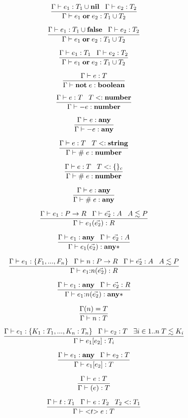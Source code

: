 \[
\dfrac{\Gamma \vdash e_{1}:T_{1} \cup \mathbf{nil} \;\;\;
       \Gamma \vdash e_{2}:T_{2}}
      {\Gamma \vdash e_{1} \; \mathbf{or} \; e_{2}:T_{1} \cup T_{2}}
\]

\[
\dfrac{\Gamma \vdash e_{1}:T_{1} \cup \mathbf{false} \;\;\;
       \Gamma \vdash e_{2}:T_{2}}
      {\Gamma \vdash e_{1} \; \mathbf{or} \; e_{2}:T_{1} \cup T_{2}}
\]

\[
\dfrac{\Gamma \vdash e_{1}:T_{1} \;\;\;
       \Gamma \vdash e_{2}:T_{2}}
      {\Gamma \vdash e_{1} \; \mathbf{or} \; e_{2}:T_{1} \cup T_{2}}
\]

\[
\dfrac{\Gamma \vdash e:T}
      {\Gamma \vdash \mathbf{not} \; e:\mathbf{boolean}}
\]

\[
\dfrac{\Gamma \vdash e:T \;\;\;
       T <: \mathbf{number}}
      {\Gamma \vdash - e:\mathbf{number}}
\]

\[
\dfrac{\Gamma \vdash e:\mathbf{any}}
      {\Gamma \vdash - e:\mathbf{any}}
\]

\[
\dfrac{\Gamma \vdash e:T \;\;\;
       T <: \mathbf{string}}
      {\Gamma \vdash \# \; e:\mathbf{number}}
\]

\[
\dfrac{\Gamma \vdash e:T \;\;\;
       T <: \{\}_{c}}
      {\Gamma \vdash \# \; e:\mathbf{number}}
\]

\[
\dfrac{\Gamma \vdash e:\mathbf{any}}
      {\Gamma \vdash \# \; e:\mathbf{any}}
\]

\[
\dfrac{\Gamma \vdash e_{1}:P \rightarrow R \;\;\;
       \Gamma \vdash \vec{e_{2}}:A \;\;\;
       A \lesssim P}
      {\Gamma \vdash e_{1}(\vec{e_{2}}):R}
\]

\[
\dfrac{\Gamma \vdash e_{1}:\mathbf{any} \;\;\;
       \Gamma \vdash \vec{e_{2}}:A}
      {\Gamma \vdash e_{1}(\vec{e_{2}}):\mathbf{any}{*}}
\]

\[
\dfrac{\Gamma \vdash e_{1}:\{F_{1}, ..., F_{n}\} \;\;\;
       \Gamma \vdash n:P \rightarrow R \;\;\;
       \Gamma \vdash \vec{e_{2}}:A \;\;\;
       A \lesssim P}
      {\Gamma \vdash e_{1}{:}n(\vec{e_{2}}):R}
\]

\[
\dfrac{\Gamma \vdash e_{1}:\mathbf{any} \;\;\;
       \Gamma \vdash \vec{e_{2}}:R}
      {\Gamma \vdash e_{1}{:}n(\vec{e_{2}}):\mathbf{any}{*}}
\]

\[
\dfrac{\Gamma(n) = T}
      {\Gamma \vdash n:T}
\]

\[
\dfrac{\Gamma \vdash e_{1}:\{K_{1}:T_{1}, ..., K_{n}:T_{n}\} \;\;\;
       \Gamma \vdash e_{2}:T \;\;\;
       \exists i \in 1{..}n \; T \lesssim K_{i}}
      {\Gamma \vdash e_{1}[e_{2}]:T_{i}}
\]

\[
\dfrac{\Gamma \vdash e_{1}:\mathbf{any} \;\;\;
       \Gamma \vdash e_{2}:T}
      {\Gamma \vdash e_{1}[e_{2}]:T}
\]

\[
\dfrac{\Gamma \vdash e:T}
      {\Gamma \vdash (e):T}
\]

\[
\dfrac{\Gamma \vdash t:T_{1} \;\;\;
       \Gamma \vdash e:T_{2} \;\;\;
       T_{2} <: T_{1}}
      {\Gamma \vdash {<}t{>} \; e:T}
\]

